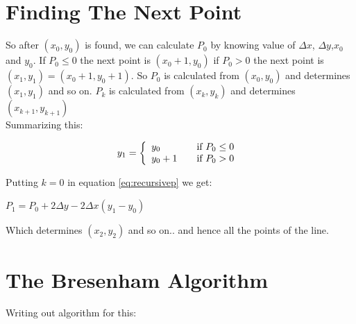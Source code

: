 \documentclass[a4paper,12pt,oneside]{book}
\begin{document}
 
\section{Finding The Next Point}
So after $(x_0,y_0)$ is found, we can calculate $P_0$ by knowing value of $\Delta x$, $\Delta y$,$x_0$ and $y_0$. If $P_0\leq 0$ the next point is $(x_0+1,y_0)$ if $P_0>0$ the next point is $(x_1,y_1)=(x_0+1,y_0+1)$. So $P_0$ is calculated from $(x_0,y_0)$ and determines $(x_1,y_1)$ and so on. $P_k$ is calculated from $(x_k,y_k)$ and determines $(x_{k+1},y_{k+1})$ \\ 
Summarizing this:
\begin{center}
\begin{equation} 
	y_1 = \left\{ 
				\begin{array}{l l}
					y_0 & \quad \text{if $P_0\leq 0$ }\\
					y_0+1 & \quad \text{if $P_0>0$ }
				\end{array} 
		\right.
\end{equation}
\end{center} 
Putting $k=0$ in equation \ref{eq:recursivep} we get:
\begin{center}
	$P_1=P_0+2\Delta y-2\Delta x (y_1-y_0)$
\end{center}

Which determines $(x_2,y_2)$ and so on.. and hence all the points of the line.

\section{The Bresenham Algorithm}
Writing out algorithm for this:
\end{document}
